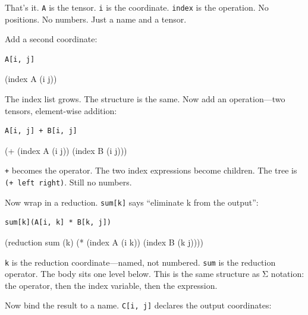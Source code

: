 \documentclass[11pt,titlepage]{article}
\newenvironment{Shaded}{}{}
\newcommand{\NormalTok}[1]{#1}
\newcommand{\OperatorTok}[1]{\textcolor[rgb]{0.40,0.40,0.40}{#1}}
\begin{document}
That's it. \texttt{A} is the tensor. \texttt{i} is the coordinate.
\texttt{index} is the operation. No positions. No numbers. Just a name
and a tensor.

Add a second coordinate:

\begin{verbatim}
A[i, j]
\end{verbatim}

\begin{Shaded}
\begin{Highlighting}[]
\NormalTok{(index A (i j))}
\end{Highlighting}
\end{Shaded}

The index list grows. The structure is the same. Now add an
operation---two tensors, element-wise addition:

\begin{verbatim}
A[i, j] + B[i, j]
\end{verbatim}

\begin{Shaded}
\begin{Highlighting}[]
\NormalTok{(}\OperatorTok{+}\NormalTok{ (index A (i j)) (index B (i j)))}
\end{Highlighting}
\end{Shaded}

\texttt{+} becomes the operator. The two index expressions become
children. The tree is \texttt{(+\ left\ right)}. Still no numbers.

Now wrap in a reduction. \texttt{sum{[}k{]}} says ``eliminate k from the
output'':

\begin{verbatim}
sum[k](A[i, k] * B[k, j])
\end{verbatim}

\begin{Shaded}
\begin{Highlighting}[]
\NormalTok{(reduction sum (k)}
\NormalTok{  (}\OperatorTok{*}\NormalTok{ (index A (i k)) (index B (k j))))}
\end{Highlighting}
\end{Shaded}

\texttt{k} is the reduction coordinate---named, not numbered.
\texttt{sum} is the reduction operator. The body sits one level below.
This is the same structure as Σ notation: the operator, then the index
variable, then the expression.

Now bind the result to a name. \texttt{C{[}i,\ j{]}} declares the output
coordinates:
\end{document}
